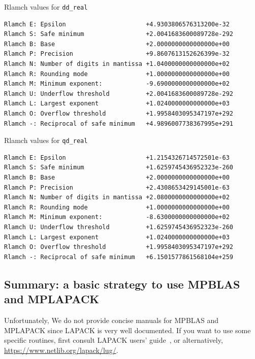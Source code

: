 \documentclass[12pt]{article}
\begin{document}
\begin{table}
\caption{Rlamch values for {\tt dd\_real}}\label{rlamch_dd}
\begin{center}
\begin{verbatim}
Rlamch E: Epsilon                      +4.9303806576313200e-32
Rlamch S: Safe minimum                 +2.0041683600089728e-292
Rlamch B: Base                         +2.0000000000000000e+00
Rlamch P: Precision                    +9.8607613152626399e-32
Rlamch N: Number of digits in mantissa +1.0400000000000000e+02
Rlamch R: Rounding mode                +1.0000000000000000e+00
Rlamch M: Minimum exponent:            -9.6900000000000000e+02
Rlamch U: Underflow threshold          +2.0041683600089728e-292
Rlamch L: Largest exponent             +1.0240000000000000e+03
Rlamch O: Overflow threshold           +1.9958403095347197e+292
Rlamch -: Reciprocal of safe minimum   +4.9896007738367995e+291
\end{verbatim}
\end{center}
\end{table}

\begin{table}
\caption{Rlamch values for {\tt qd\_real}}\label{rlamch_qd}
\begin{center}
\begin{verbatim}
Rlamch E: Epsilon                      +1.2154326714572501e-63
Rlamch S: Safe minimum                 +1.6259745436952323e-260
Rlamch B: Base                         +2.0000000000000000e+00
Rlamch P: Precision                    +2.4308653429145001e-63
Rlamch N: Number of digits in mantissa +2.0800000000000000e+02
Rlamch R: Rounding mode                +1.0000000000000000e+00
Rlamch M: Minimum exponent:            -8.6300000000000000e+02
Rlamch U: Underflow threshold          +1.6259745436952323e-260
Rlamch L: Largest exponent             +1.0240000000000000e+03
Rlamch O: Overflow threshold           +1.9958403095347197e+292
Rlamch -: Reciprocal of safe minimum   +6.1501577861568104e+259
\end{verbatim}
\end{center}
\end{table}

\subsection{Summary: a basic strategy to use MPBLAS and MPLAPACK}

Unfortunately, We do not provide concise manuals for MPBLAS and MPLAPACK since LAPACK is very well documented. If you want to use some specific routines,
first consult LAPACK users' guide~\cite{laug}, or alternatively, \url{https://www.netlib.org/lapack/lug/}.
\end{document}
